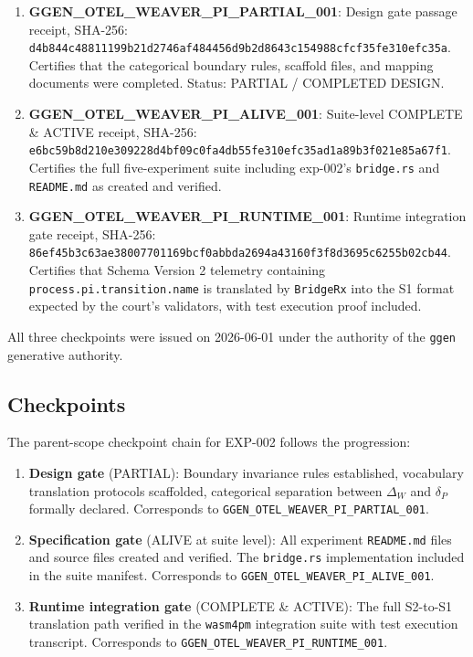 \begin{enumerate}
    \item \textbf{GGEN\_OTEL\_WEAVER\_PI\_PARTIAL\_001}: Design gate passage receipt,
          SHA-256: \texttt{d4b844c48811199b21d2746af484456d9b2d8643c154988cfcf35fe310efc35a}.
          Certifies that the categorical boundary rules, scaffold files, and
          mapping documents were completed. Status: PARTIAL / COMPLETED DESIGN.

    \item \textbf{GGEN\_OTEL\_WEAVER\_PI\_ALIVE\_001}: Suite-level COMPLETE \& ACTIVE
          receipt, SHA-256:
          \texttt{e6bc59b8d210e309228d4bf09c0fa4db55fe310efc35ad1a89b3f021e85a67f1}.
          Certifies the full five-experiment suite including exp-002's
          \texttt{bridge.rs} and \texttt{README.md} as created and verified.

    \item \textbf{GGEN\_OTEL\_WEAVER\_PI\_RUNTIME\_001}: Runtime integration gate
          receipt, SHA-256:
          \texttt{86ef45b3c63ae38007701169bcf0abbda2694a43160f3f8d3695c6255b02cb44}.
          Certifies that Schema Version 2 telemetry containing
          \texttt{process.pi.transition.name} is translated by \texttt{BridgeRx}
          into the S1 format expected by the court's validators, with test execution
          proof included.
\end{enumerate}

All three checkpoints were issued on 2026-06-01 under the authority of the
\texttt{ggen} generative authority.

\subsection{Checkpoints}
\label{sec:otel-weaver-exp-002-diff-to-residual-evidence-checkpoints}

The parent-scope checkpoint chain for EXP-002 follows the progression:

\begin{enumerate}
    \item \textbf{Design gate} (PARTIAL): Boundary invariance rules established,
          vocabulary translation protocols scaffolded, categorical separation between
          $\Delta_W$ and $\delta_P$ formally declared. Corresponds to
          \texttt{GGEN\_OTEL\_WEAVER\_PI\_PARTIAL\_001}.

    \item \textbf{Specification gate} (ALIVE at suite level): All experiment
          \texttt{README.md} files and source files created and verified. The
          \texttt{bridge.rs} implementation included in the suite manifest.
          Corresponds to \texttt{GGEN\_OTEL\_WEAVER\_PI\_ALIVE\_001}.

    \item \textbf{Runtime integration gate} (COMPLETE \& ACTIVE): The full S2-to-S1
          translation path verified in the \texttt{wasm4pm} integration suite with
          test execution transcript. Corresponds to
          \texttt{GGEN\_OTEL\_WEAVER\_PI\_RUNTIME\_001}.
\end{enumerate}

